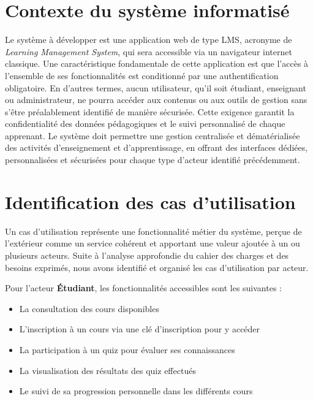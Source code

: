 \documentclass[12pt,a4paper]{report}
\begin{document}
\section{Contexte du système informatisé}
Le système à développer est une application web de type LMS, acronyme de \textit{Learning Management System}, qui sera accessible via un navigateur internet classique. Une caractéristique fondamentale de cette application est que l'accès à l'ensemble de ses fonctionnalités est conditionné par une authentification obligatoire. En d'autres termes, aucun utilisateur, qu'il soit étudiant, enseignant ou administrateur, ne pourra accéder aux contenus ou aux outils de gestion sans s'être préalablement identifié de manière sécurisée. Cette exigence garantit la confidentialité des données pédagogiques et le suivi personnalisé de chaque apprenant. Le système doit permettre une gestion centralisée et dématérialisée des activités d'enseignement et d'apprentissage, en offrant des interfaces dédiées, personnalisées et sécurisées pour chaque type d'acteur identifié précédemment.

\section{Identification des cas d'utilisation}
Un cas d'utilisation représente une fonctionnalité métier du système, perçue de l'extérieur comme un service cohérent et apportant une valeur ajoutée à un ou plusieurs acteurs. Suite à l'analyse approfondie du cahier des charges et des besoins exprimés, nous avons identifié et organisé les cas d'utilisation par acteur.

Pour l'acteur \textbf{Étudiant}, les fonctionnalités accessibles sont les suivantes :
\begin{itemize}
    \item La consultation des cours disponibles
    \item L'inscription à un cours via une clé d'inscription pour y accéder
    \item La participation à un quiz pour évaluer ses connaissances
    \item La visualisation des résultats des quiz effectués
    \item Le suivi de sa progression personnelle dans les différents cours
\end{itemize}
\end{document}

